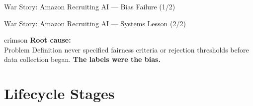 \documentclass[aspectratio=169, 12pt]{beamer}
\begin{document}
\begin{frame}{War Story: Amazon Recruiting AI --- Bias Failure (1/2)}
\end{frame}

\begin{frame}{War Story: Amazon Recruiting AI --- Systems Lesson (2/2)}
\note{
%
%
%
}

\small
\begin{mlsyscard}{crimson}
\textbf{Root cause:}\\[0.1cm]
{\normalsize Problem Definition never specified fairness criteria or rejection thresholds before data collection began. \textbf{The labels were the bias.}}
\end{mlsyscard}

\vspace{0.3cm}

\vspace{0.2cm}

\end{frame}

\section{Lifecycle Stages}
\end{document}
